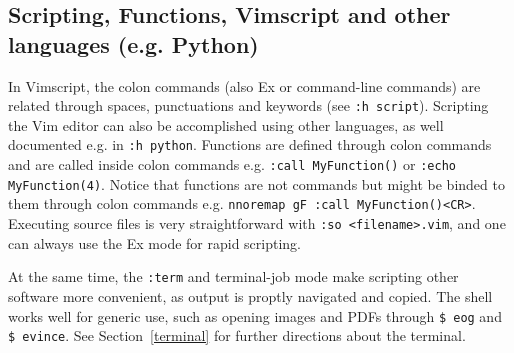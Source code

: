 \documentclass{article}
\newcommand{\tttt}[1] {
	\texttt{#1}}
\begin{document}
\subsection{Scripting, Functions, Vimscript and other languages (e.g.  Python)}
In Vimscript,
the colon commands (also Ex or command-line commands) are related through spaces,
punctuations and keywords (see \texttt{:h script}).
Scripting the Vim editor can also be accomplished using other languages,
as well documented e.g. in \tttt{:h python}.
Functions are defined through colon commands and are called
inside colon commands e.g. \tttt{:call MyFunction()}
or \tttt{:echo MyFunction(4)}.
Notice that functions are not commands but might be binded to them
through colon commands e.g. \tttt{nnoremap gF :call MyFunction()<CR>}.
Executing source files is very straightforward with \tttt{:so
<filename>.vim},
and one can always use the Ex mode for rapid scripting.

At the same time, the \tttt{:term} and terminal-job mode make
scripting other software more convenient, as output is
proptly navigated and copied. The shell works well for generic use,
such as opening images and PDFs through \tttt{\$ eog} and \tttt{\$ evince}.
See Section~\ref{terminal} for further directions about the terminal.
\end{document}
